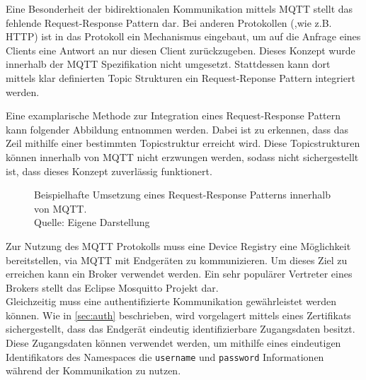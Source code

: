 Eine Besonderheit der bidirektionalen Kommunikation mittels \ac{MQTT} stellt das fehlende Request-Response Pattern dar. Bei anderen Protokollen (,wie z.B. HTTP) ist in das Protokoll ein Mechanismus eingebaut, um auf die Anfrage eines Clients eine Antwort an nur diesen Client zurückzugeben. Dieses Konzept wurde innerhalb der MQTT Spezifikation nicht umgesetzt. Stattdessen kann dort mittels klar definierten Topic Strukturen ein Request-Reponse Pattern integriert werden.
\pagebreak
\begin{example} Eine examplarische Methode zur Integration eines Request-Response Pattern kann folgender Abbildung entnommen werden. Dabei ist zu erkennen, dass das Zeil mithilfe einer bestimmten Topicstruktur erreicht wird. Diese Topicstrukturen können innerhalb von MQTT nicht erzwungen werden, sodass nicht sichergestellt ist, dass dieses Konzept zuverlässig funktionert.

    \begin{figure}[h]
        \centering
        \caption[Request-Response Pattern innerhalb von MQTT]{Beispielhafte Umsetzung eines Request-Response Patterns innerhalb von MQTT.\\Quelle: Eigene Darstellung}
    \end{figure}
\end{example}

Zur Nutzung des \ac{MQTT} Protokolls muss eine Device Registry eine Möglichkeit bereitstellen, via MQTT mit Endgeräten zu kommunizieren. Um dieses Ziel zu erreichen kann ein Broker verwendet werden. Ein sehr populärer Vertreter eines Brokers stellt das Eclipse Mosquitto Projekt dar.\\
Gleichzeitig muss eine authentifizierte Kommunikation gewährleistet werden können. Wie in \vref{sec:auth} beschrieben, wird vorgelagert mittels eines Zertifikats sichergestellt, dass das Endgerät eindeutig identifizierbare Zugangsdaten besitzt. Diese Zugangsdaten können verwendet werden, um mithilfe eines eindeutigen Identifikators des Namespaces die \texttt{username} und \texttt{password} Informationen während der Kommunikation zu nutzen.

